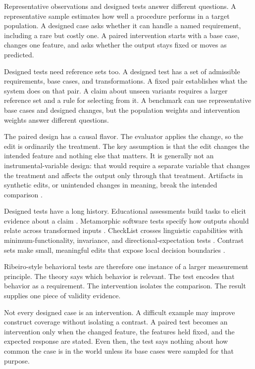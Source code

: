 \documentclass[11pt]{article}
\begin{document}
Representative observations and designed tests answer different questions. A representative sample estimates how well a procedure performs in a target population. A designed case asks whether it can handle a named requirement, including a rare but costly one. A paired intervention starts with a base case, changes one feature, and asks whether the output stays fixed or moves as predicted.

Designed tests need reference sets too. A designed test has a set of admissible requirements, base cases, and transformations. A fixed pair establishes what the system does on that pair. A claim about unseen variants requires a larger reference set and a rule for selecting from it. A benchmark can use representative base cases and designed changes, but the population weights and intervention weights answer different questions.

The paired design has a causal flavor. The evaluator applies the change, so the edit is ordinarily the treatment. The key assumption is that the edit changes the intended feature and nothing else that matters. It is generally not an instrumental-variable design: that would require a separate variable that changes the treatment and affects the output only through that treatment. Artifacts in synthetic edits, or unintended changes in meaning, break the intended comparison \citep{sood2025causaldebiasing}.

Designed tests have a long history. Educational assessments build tasks to elicit evidence about a claim \citep{mislevy2003structure}. Metamorphic software tests specify how outputs should relate across transformed inputs \citep{chen2018metamorphic}. CheckList crosses linguistic capabilities with minimum-functionality, invariance, and directional-expectation tests \citep{ribeiro2020checklist}. Contrast sets make small, meaningful edits that expose local decision boundaries \citep{gardner2020contrast}.

Ribeiro-style behavioral tests are therefore one instance of a larger measurement principle. The theory says which behavior is relevant. The test encodes that behavior as a requirement. The intervention isolates the comparison. The result supplies one piece of validity evidence.

Not every designed case is an intervention. A difficult example may improve construct coverage without isolating a contrast. A paired test becomes an intervention only when the changed feature, the features held fixed, and the expected response are stated. Even then, the test says nothing about how common the case is in the world unless its base cases were sampled for that purpose.
\end{document}
